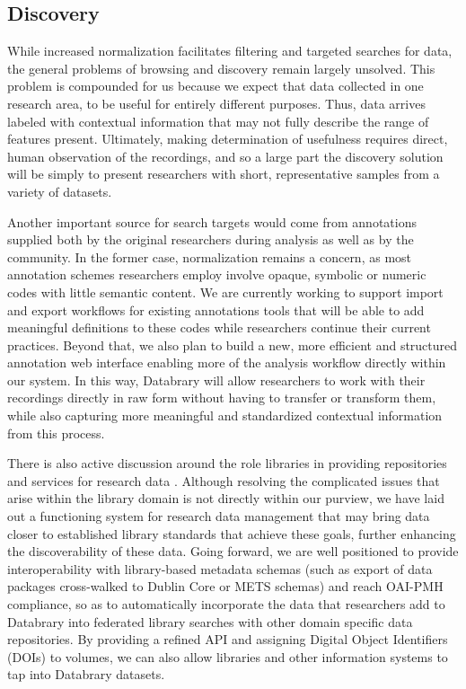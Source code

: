 \documentclass{sig-alternate}
\begin{document}
\subsection{Discovery}

While increased normalization facilitates filtering and targeted searches for data, the general problems of browsing and discovery remain largely unsolved.
This problem is compounded for us because we expect that data collected in one research area, to be useful for entirely different purposes.
Thus, data arrives labeled with contextual information that may not fully describe the range of features present.
Ultimately, making determination of usefulness requires direct, human observation of the recordings, and so a large part the discovery solution will be simply to present researchers with short, representative samples from a variety of datasets.

Another important source for search targets would come from annotations supplied both by the original researchers during analysis as well as by the community.
In the former case, normalization remains a concern, as most annotation schemes researchers employ involve opaque, symbolic or numeric codes with little semantic content.
We are currently working to support import and export workflows for existing annotations tools that will be able to add meaningful definitions to these codes while researchers continue their current practices.
Beyond that, we also plan to build a new, more efficient and structured annotation web interface enabling more of the analysis workflow directly within our system.
In this way, Databrary will allow researchers to work with their recordings directly in raw form without having to transfer or transform them, while also capturing more meaningful and standardized contextual information from this process.

There is also active discussion around the role libraries in providing repositories and services for research data \cite{Castelli_etal_2013,Nielson_Hjørland_2014,Macmillan_2014,Pinfield_etal_2014}.
Although resolving the complicated issues that arise within the library domain is not directly within our purview, we have laid out a functioning system for research data management that may bring data closer to established library standards that achieve these goals, further enhancing the discoverability of these data.
Going forward, we are well positioned to provide interoperability with library-based metadata schemas (such as export of data packages cross-walked to Dublin Core or METS schemas) and reach OAI-PMH compliance, so as to automatically incorporate the data that researchers add to Databrary into federated library searches with other domain specific data repositories.
By providing a refined API and assigning Digital Object Identifiers (DOIs) to volumes, we can also allow libraries and other information systems to tap into Databrary datasets.
\end{document}
